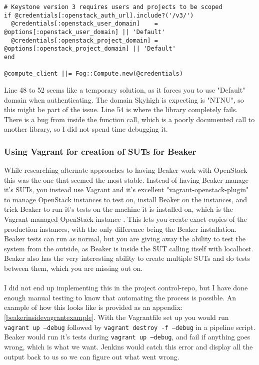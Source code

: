 \begin{verbatim}
# Keystone version 3 requires users and projects to be scoped
if @credentials[:openstack_auth_url].include?('/v3/')
  @credentials[:openstack_user_domain]    = @options[:openstack_user_domain] || 'Default'
  @credentials[:openstack_project_domain] = @options[:openstack_project_domain] || 'Default'
end

@compute_client ||= Fog::Compute.new(@credentials)
\end{verbatim}

Line 48 to 52 seems like a temporary solution, as it forces you to use "Default" domain when authenticating. The domain Skyhigh is expecting is "NTNU", so this might be part of the issue. Line 54 is where the library completely fails. There is a bug from inside the function call, which is a poorly documented call to another library, so I did not spend time debugging it.

\subsubsection{Using Vagrant for creation of SUTs for Beaker} \label{beakerinsidevagrantexplanation}

While researching alternate approaches to having Beaker work with OpenStack this was the one that seemed the most stable. Instead of having Beaker manage it's SUTs, you instead use Vagrant and it's excellent "vagrant-openstack-plugin" to manage OpenStack instances to test on, install Beaker on the instances, and trick Beaker to run it's tests on the machine it is installed on, which is the Vagrant-managed OpenStack instance \cite{puppetmodulefunctionaltestingbeakerinsidevagrant}\cite{openstackpuppetmodulefunctionaltestingproposal}. This lets you create exact copies of the production instances, with the only difference being the Beaker installation. Beaker tests can run as normal, but you are giving away the ability to test the system from the outside, as Beaker is inside the SUT calling itself with localhost. Beaker also has the very interesting ability to create multiple SUTs and do tests between them, which you are missing out on.
\\
\\
I did not end up implementing this in the project control-repo, but I have done enough manual testing to know that automating the process is possible. An example of how this looks like is provided as an appendix: \ref{beakerinsidevagrantexample}. With the Vagrantfile set up you would run \texttt{vagrant up --debug} followed by \texttt{vagrant destroy -f --debug} in a pipeline script. Beaker would run it's tests during \texttt{vagrant up --debug}, and fail if anything goes wrong, which is what we want. Jenkins would catch this error and display all the output back to us so we can figure out what went wrong.

